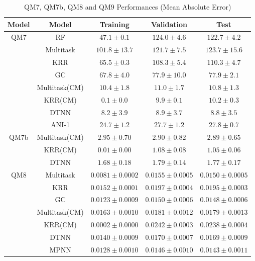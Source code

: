 \begin{table}[H]
    \small
    \centering
    \caption{QM7, QM7b, QM8 and QM9 Performances (Mean Absolute Error)}
    \begin{tabular}{ |c|c|c|c|c| } 
    \hline
    \textbf{Model} & \textbf{Model} & \textbf{Training} & \textbf{Validation} & \textbf{Test} \\
    \hline
    \hline    
    \multirow{8}{*}{QM7}
    & RF & $47.1\pm0.1$ & $124.0\pm4.6$ & $122.7\pm4.2$ \\\cline{2-5}
    & Multitask & $101.8\pm13.7$ & $121.7\pm7.5$ & $123.7\pm15.6$ \\\cline{2-5}
    & KRR & $65.5\pm0.3$ & $108.3\pm5.4$ & $110.3\pm4.7$ \\\cline{2-5}
    & GC & $67.8\pm4.0$ & $77.9\pm10.0$ & $77.9\pm2.1$ \\\cline{2-5}
    & Multitask(CM) & $10.4\pm1.8$ & $11.0\pm1.7$ & $10.8\pm1.3$ \\\cline{2-5}
    & KRR(CM) & $0.1\pm0.0$ & $9.9\pm0.1$ & $10.2\pm0.3$ \\\cline{2-5}
    & DTNN & $8.2\pm3.9$ & $\mathbf{8.9\pm3.7}$ & $\mathbf{8.8\pm3.5}$ \\\cline{2-5}
    & ANI-1 & $24.7\pm1.2$ & $27.7\pm1.2$ & $27.8\pm0.7$ \\\cline{2-5}
    \hline
    \hline
    \multirow{3}{*}{QM7b}
    & Multitask(CM) & $2.95\pm0.70$ & $2.90\pm0.82$ & $2.89\pm0.65$ \\\cline{2-5}
    & KRR(CM) & $0.01\pm0.00$ & $\mathbf{1.08\pm0.08}$ & $\mathbf{1.05\pm0.06}$ \\\cline{2-5}
    & DTNN & $1.68\pm0.18$ & $1.79\pm0.14$ & $1.77\pm0.17$ \\\cline{2-5}
    \hline
    \hline    
    \multirow{7}{*}{QM8}
    & Multitask & $0.0081\pm0.0002$ & $0.0155\pm0.0005$ & $0.0150\pm0.0005$ \\\cline{2-5}
    & KRR & $0.0152\pm0.0001$ & $0.0197\pm0.0004$ & $0.0195\pm0.0003$ \\\cline{2-5}
    & GC & $0.0123\pm0.0009$ & $0.0150\pm0.0006$ & $0.0148\pm0.0006$ \\\cline{2-5}
    & Multitask(CM) & $0.0163\pm0.0010$ & $0.0181\pm0.0012$ & $0.0179\pm0.0013$ \\\cline{2-5}
    & KRR(CM) & $0.0002\pm0.0000$ & $0.0242\pm0.0003$ & $0.0238\pm0.0004$ \\\cline{2-5}
    & DTNN & $0.0140\pm0.0009$ & $0.0170\pm0.0007$ & $0.0169\pm0.0009$ \\\cline{2-5}
    & MPNN & $0.0128\pm0.0010$ & $\mathbf{0.0146\pm0.0010}$ & $\mathbf{0.0143\pm0.0011}$ \\\cline{2-5}

\end{tabular}
\end{table}
